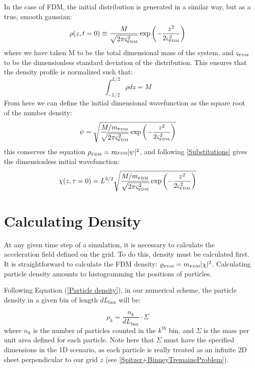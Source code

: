 \documentclass[oneside]{book}
\begin{document}
In the case of FDM, the initial distribution is generated in a similar way, but as a true, smooth gaussian:
\begin{equation}
    \rho(z,t=0) \equiv \frac{M}{\sqrt{2\pi \varsigma^2_\text{\tiny{FDM}}}}\exp\left(-\frac{z^2}{2 \varsigma^2_\text{\tiny{FDM}}}\right)
\end{equation}
where we have taken M to be the total dimensional mass of the system, and $\varsigma_\text{\tiny{FDM}}$ to be the dimensionless standard deviation of the distribution. This ensures that the density profile is normalized such that:
$$\int_{-L/2}^{L/2} \rho dz  = M$$
From here we can define the initial dimensional wavefunction as the square root of the number density:
\begin{equation}
    \psi = \sqrt{\frac{M/m_\text{\tiny{FDM}}}{\sqrt{2\pi \varsigma^2_\text{\tiny{FDM}}}}\exp\left(-\frac{z^2}{2 \varsigma^2_\text{\tiny{FDM}}}\right)}
\end{equation}
this conserves the equation $\rho_\text{\tiny{FDM}} = m\text{\tiny{FDM}} |\psi|^2$, and following \ref{Substitutions} gives the dimensionless initial wavefunction:
\begin{equation}
    \chi(z,\tau=0) = L^{3/2}\sqrt{\frac{M/m_\text{\tiny{FDM}}}{\sqrt{2\pi \varsigma^2_\text{\tiny{FDM}}}}\exp\left(-\frac{z^2}{2 \varsigma^2_\text{\tiny{FDM}}}\right)}
\end{equation}
\section{Calculating Density}
At any given time step of a simulation, it is necessary to calculate the acceleration field defined on the grid. To do this, density must be calculated first. It is straightforward to calculate the FDM density: $\varrho_\text{\tiny{FDM}} = m_\text{\tiny{FDM}}|\chi|^2$. Calculating particle density amounts to histogramming the positions of particles.

Following Equation (\ref{Particle density}), in our numerical scheme, the particle density in a given bin of length $d L_\text{box}$ will be:

\begin{equation}
\rho_k = \frac{n_k}{d L_\text{box}}\cdot \Sigma
\label{Numerical Particle Density}
\end{equation}
where $n_k$ is the number of particles counted in the $k^\text{th}$ bin, and $\Sigma$ is the mass per unit area defined for each particle. Note here that $\Sigma$ must have the specified dimensions in the 1D scenario, as each particle is really treated as an infinite 2D sheet perpendicular to our grid $z$ (see \cref{Spitzer+BinneyTremaineProblem}). 
\end{document}
